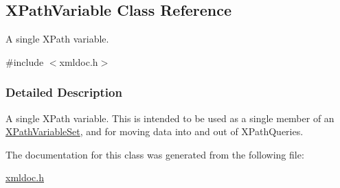 \hypertarget{classXPathVariable}{
\subsection{XPathVariable Class Reference}
\label{classXPathVariable}
}


A single XPath variable.  




{\ttfamily \#include $<$xmldoc.h$>$}



\subsubsection{Detailed Description}
A single XPath variable. This is intended to be used as a single member of an \hyperlink{classXPathVariableSet}{XPathVariableSet}, and for moving data into and out of XPathQueries. 

The documentation for this class was generated from the following file:\begin{DoxyCompactItemize}
\item 
\hyperlink{xmldoc_8h}{xmldoc.h}\end{DoxyCompactItemize}
